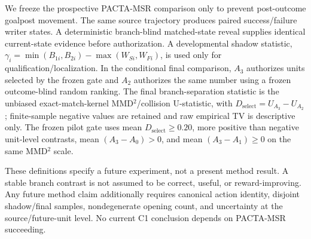We freeze the prospective PACTA-MSR comparison only to prevent post-outcome goalpost movement. The same source trajectory produces paired success/failure writer states. A deterministic branch-blind matched-state reveal supplies identical current-state evidence before authorization. A developmental shadow statistic, $\gamma_i=\min(B_{1i},B_{2i})-\max(W_{Si},W_{Fi})$, is used only for qualification/localization. In the conditional final comparison, $A_3$ authorizes units selected by the frozen gate and $A_2$ authorizes the same number using a frozen outcome-blind random ranking. The final branch-separation statistic is the unbiased exact-match-kernel MMD$^2$/collision U-statistic, with $D_{\mathrm{select}}=U_{A_3}-U_{A_2}$; finite-sample negative values are retained and raw empirical TV is descriptive only. The frozen pilot gate uses mean $D_{\mathrm{select}}\ge 0.20$, more positive than negative unit-level contrasts, mean $(A_3-A_0)>0$, and mean $(A_3-A_1)\ge0$ on the same MMD$^2$ scale.

These definitions specify a future experiment, not a present method result. A stable branch contrast is not assumed to be correct, useful, or reward-improving. Any future method claim additionally requires canonical action identity, disjoint shadow/final samples, nondegenerate opening count, and uncertainty at the source/future-unit level. No current C1 conclusion depends on PACTA-MSR succeeding.
